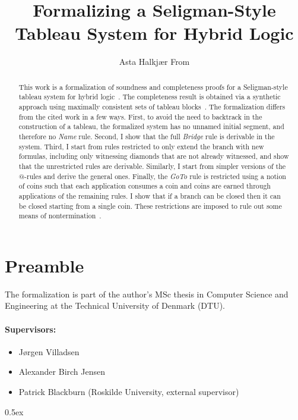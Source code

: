 \documentclass[11pt,a4paper]{article}
\begin{document}
\title{Formalizing a Seligman-Style Tableau System for Hybrid Logic}
\author{Asta Halkjær From}
\maketitle

\begin{abstract}
  This work is a formalization of soundness and completeness proofs for a Seligman-style tableau system for hybrid logic~\cite{jlog17}.
  The completeness result is obtained via a synthetic approach using maximally consistent sets of tableau blocks~\cite{aiml16}.
  The formalization differs from the cited work in a few ways.
  First, to avoid the need to backtrack in the construction of a tableau, the formalized system has no unnamed initial segment, and therefore no \textit{Name} rule.
  Second, I show that the full \textit{Bridge} rule is derivable in the system.
  Third, I start from rules restricted to only extend the branch with new formulas, including only witnessing diamonds that are not already witnessed, and show that the unrestricted rules are derivable.
  Similarly, I start from simpler versions of the \( @ \)-rules and derive the general ones.
  Finally, the \textit{GoTo} rule is restricted using a notion of coins such that each application consumes a coin and coins are earned through applications of the remaining rules.
  I show that if a branch can be closed then it can be closed starting from a single coin.
  These restrictions are imposed to rule out some means of nontermination~\cite{jlog17}.
\end{abstract}

\section*{Preamble}

The formalization is part of the author's MSc thesis in Computer Science and Engineering at the Technical University of Denmark (DTU).

\paragraph{Supervisors:}

\begin{itemize}
  \item Jørgen Villadsen
  \item Alexander Birch Jensen
  \item Patrick Blackburn (Roskilde University, external supervisor)
\end{itemize}

\newpage
\tableofcontents

\newpage

\parindent 0pt\parskip 0.5ex



\nocite{*}




\end{document}
